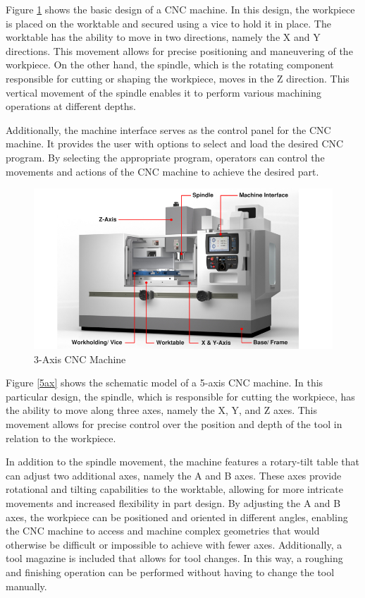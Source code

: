 Figure \ref{3ax} shows the basic design of a CNC machine. In this design, the workpiece is placed on the worktable and secured using a vice to hold it in place. The worktable has the ability to move in two directions, namely the X and Y directions. This movement allows for precise positioning and maneuvering of the workpiece. On the other hand, the spindle, which is the rotating component responsible for cutting or shaping the workpiece, moves in the Z direction. This vertical movement of the spindle enables it to perform various machining operations at different depths.

Additionally, the machine interface serves as the control panel for the CNC machine. It provides the user with options to select and load the desired CNC program. By selecting the appropriate program, operators can control the movements and actions of the CNC machine to achieve the desired part.


 
\begin{figure}[H]
	\centerline{\includegraphics[scale=.6]{figures/basicCNC.jpg}}
	\caption{3-Axis CNC Machine \cite{3ax}}
	\label{3ax}
\end{figure}

Figure \ref{5ax} shows the schematic model of a 5-axis CNC machine. In this particular design, the spindle, which is responsible for cutting the workpiece, has the ability to move along three axes, namely the X, Y, and Z axes. This movement allows for precise control over the position and depth of the tool in relation to the workpiece.

In addition to the spindle movement, the machine features a rotary-tilt table that can adjust two additional axes, namely the A and B axes. These axes provide rotational and tilting capabilities to the worktable, allowing for more intricate movements and increased flexibility in part design. By adjusting the A and B axes, the workpiece can be positioned and oriented in different angles, enabling the CNC machine to access and machine complex geometries that would otherwise be difficult or impossible to achieve with fewer axes. Additionally, a tool magazine is included that allows for tool changes. In this way, a roughing and finishing operation can be performed without having to change the tool manually.


